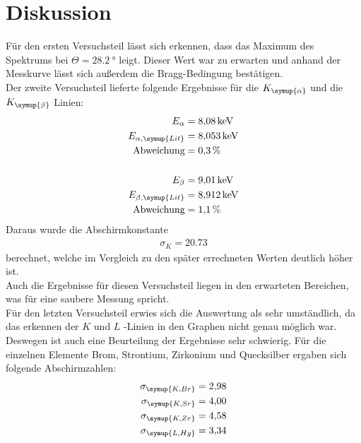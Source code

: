 \section{Diskussion}
\label{sec:Diskussion}

Für den ersten Versuchsteil lässt sich erkennen, dass das Maximum des Spektrums
bei $\Theta = \SI{28.2}{\degree}$ leigt. Dieser Wert war zu erwarten und anhand der
Messkurve lässt sich außerdem die Bragg-Bedingung bestätigen.\\
Der zweite Versuchsteil lieferte folgende Ergebnisse für die $K_\symup{\alpha}$ und
die $K_\symup{\beta}$ Linien:\\
\begin{align*}
  E_\alpha &= \SI{8.08}{\kilo\eV}\\
  E_{\alpha,\symup{Lit}} &= \SI{8.053}{\kilo\eV}\\
  \text{Abweichung} &= \SI{0.3}{\percent}\\\\
  E_\beta &= \SI{9.01}{\kilo\eV}\\
  E_{\beta,\symup{Lit}} &= \SI{8.912}{\kilo\eV}\\
  \text{Abweichung} &= \SI{1.1}{\percent}\\
\end{align*}
Daraus wurde die Abschirmkonstante
\begin{align*}
  \sigma_K = \num{20.73}
\end{align*}
berechnet, welche im Vergleich zu den später errechneten Werten deutlich höher ist.\\
Auch die Ergebnisse für diesen Versuchsteil liegen in den erwarteten Bereichen,
was für eine saubere Messung spricht.\\
Für den letzten Versuchsteil erwies sich die Auswertung als sehr umständlich, da
das erkennen der $K$ und $L$ -Linien in den Graphen nicht genau möglich war. Deswegen
ist auch eine Beurteilung der Ergebnisse sehr schwierig. Für die einzelnen
Elemente Brom, Strontium, Zirkonium und Quecksilber ergaben sich folgende
Abschirmzahlen:
\begin{align*}
  \sigma_\symup{K,Br} &= \num{2.98}\\
  \sigma_\symup{K,Sr} &= \num{4.00}\\
  \sigma_\symup{K,Zr} &= \num{4.58}\\
  \sigma_\symup{L,Hg} &= \num{3.34}\\
\end{align*}

\nocite{sample}
\nocite{alpha}
